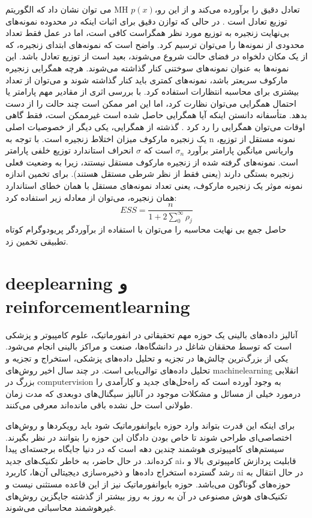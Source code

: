 می توان نشان داد که الگوریتم MH تعادل دقیق را برآورده می‌کند و از این رو،$p(x)$ توزیع تعادل است \cite{bishop2006pattern}. در حالی که توازن دقیق برای اثبات اینکه در محدوده نمونه‌های بی‌نهایت زنجیره به توزیع مورد نظر همگراست کافی است، اما در عمل فقط تعداد محدودی از نمونه‌ها را می‌توان ترسیم کرد. واضح است که نمونه‌های ابتدای زنجیره، که از یک مکان دلخواه در فضای حالت شروع می‌شوند، بعید است از توزیع تعادل باشد. این نمونه‌ها به عنوان نمونه‌های سوختنی کنار گذاشته می‌شوند. هرچه همگرایی زنجیره مارکوف سریعتر باشد، نمونه‌های کمتری باید کنار گذاشته شوند و می‌توان از تعداد بیشتری برای محاسبه انتظارات استفاده کرد. با بررسی اثری از مقادیر مهم پارامتر یا احتمال همگرایی می‌توان نظارت کرد، اما این امر ممکن است چند حالت را از دست بدهد. متأسفانه دانستن اینکه آیا همگرایی حاصل شده است غیرممکن است، فقط گاهی اوقات می‌توان همگرایی را رد کرد \cite{gelman2011inference}. گذشته از همگرایی، یکی دیگر از خصوصیات اصلی یک زنجیره مارکوف میزان اختلاط زنجیره است. با توجه به n نمونه مستقل از توزیع، واریانس میانگین پارامتر برآورد $ \sigma_n $ است که $\sigma$ انحراف استاندارد توزیع خلفی پارامتر است. نمونه‌های گرفته شده از زنجیره مارکوف مستقل نیستند، زیرا به وضعیت فعلی زنجیره بستگی دارند (یعنی فقط از نظر شرطی مستقل هستند). برای تخمین اندازه نمونه موثر یک زنجیره مارکوف، یعنی تعداد نمونه‌های مستقل با همان خطای استاندارد همان زنجیره، می‌توان از معادله زیر استفاده کرد:
\begin{equation}
	E S S=\frac{n}{1+2 \sum_{0}^{\infty} \rho_{j}}
\end{equation}
حاصل جمع بی نهایت محاسبه  را می‌توان با استفاده از برآوردگر پریودوگرام کوتاه تطبیقی  \cite{sokal1997monte} تخمین زد.


\section{\gls{deeplearning} و \gls{reinforcementlearning}}

آنالیز داده‌های بالینی یک حوزه مهم تحقیقاتی در انفورماتیک، علوم کامپیوتر و پزشکی است که توسط محققان شاغل در دانشگاه‌ها، صنعت و مراکز بالینی انجام می‌شود. یکی از بزرگ‌ترین چالش‌ها در تجزیه و تحلیل داده‌های پزشکی، استخراج و تجزیه و تحلیل داده‌های توالی‌یابی است. در چند سال اخیر روش‌های \gls{machinelearning} انقلابی بزرگ در \gls{computervision} به وجود آورده است که راه‌حل‌های جدید و کارآمدی را درمورد خیلی از مسائل و مشکلات موجود در آنالیز سیگنال‌های دوبعدی که مدت زمان طولانی است حل نشده باقی مانده‌اند معرفی می‌کنند. 

برای اینکه این قدرت بتواند وارد حوزه بایوانفورماتیک شود باید رویکردها و روش‌های اختصاصی‌ای طراحی شوند تا خاص بودن دادگان این حوزه را بتوانند در نظر بگیرند. 
سیستم‌های کامپیوتری هوشمند چندین دهه است که در دنیا جایگاه برجسته‌ای پیدا کرده‌اند. در حال حاضر، به خاطر تکنیک‌های جدید \gls{ai}، قابلیت پردازش کامپیوتری بالا و رشد گسترده استخراج داده‌ها و ذخیره‌سازی دیجیتالی آن‌ها، کاربرد \gls{ai} در حال انتقال به حوزه‌های گوناگون می‌باشد. حوزه بایوانفورماتیک نیز از این قاعده مستثنی نیست و تکنیک‌های هوش مصنوعی در آن به روز به روز بیشتر از گذشته جایگزین روش‌های غیرهوشمند محاسباتی می‌شوند. 

